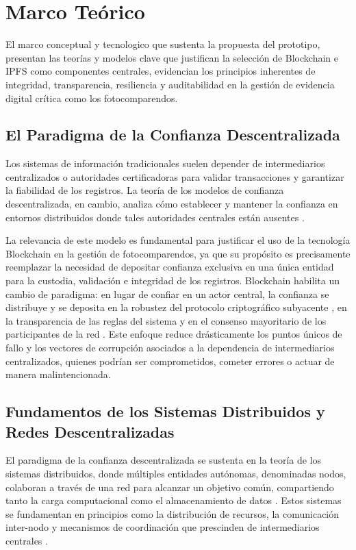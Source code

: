\section{\large Marco Teórico}
El marco conceptual y tecnologico que sustenta la propuesta del prototipo, presentan las teorías y modelos clave que justifican la selección de Blockchain e IPFS como componentes centrales, evidencian los principios inherentes de integridad, transparencia, resiliencia y auditabilidad en la gestión de evidencia digital crítica como los fotocomparendos.
\subsection{El Paradigma de la Confianza Descentralizada}
Los sistemas de información tradicionales suelen depender de intermediarios centralizados o autoridades certificadoras para validar transacciones y garantizar la fiabilidad de los registros. La teoría de los modelos de confianza descentralizada, en cambio, analiza cómo establecer y mantener la confianza en entornos distribuidos donde tales autoridades centrales están ausentes \parencite{swan2015blockchain}.

La relevancia de este modelo es fundamental para justificar el uso de la tecnología Blockchain en la gestión de fotocomparendos, ya que su propósito es precisamente reemplazar la necesidad de depositar confianza exclusiva en una única entidad para la custodia, validación e integridad de los registros. Blockchain habilita un cambio de paradigma: en lugar de confiar en un actor central, la confianza se distribuye y se deposita en la robustez del protocolo criptográfico subyacente \parencite{nakamoto2008bitcoin}, en la transparencia de las reglas del sistema y en el consenso mayoritario de los participantes de la red \parencite{antonopoulos2023mastering}. Este enfoque reduce drásticamente los puntos únicos de fallo y los vectores de corrupción asociados a la dependencia de intermediarios centralizados, quienes podrían ser comprometidos, cometer errores o actuar de manera malintencionada.

\subsection{Fundamentos de los Sistemas Distribuidos y Redes Descentralizadas}
El paradigma de la confianza descentralizada se sustenta en la teoría de los sistemas distribuidos, donde múltiples entidades autónomas, denominadas nodos, colaboran a través de una red para alcanzar un objetivo común, compartiendo tanto la carga computacional como el almacenamiento de datos \parencite{vanSteen2017}. Estos sistemas se fundamentan en principios como la distribución de recursos, la comunicación inter-nodo y mecanismos de coordinación que prescinden de intermediarios centrales \parencite{coulouris2011}.

